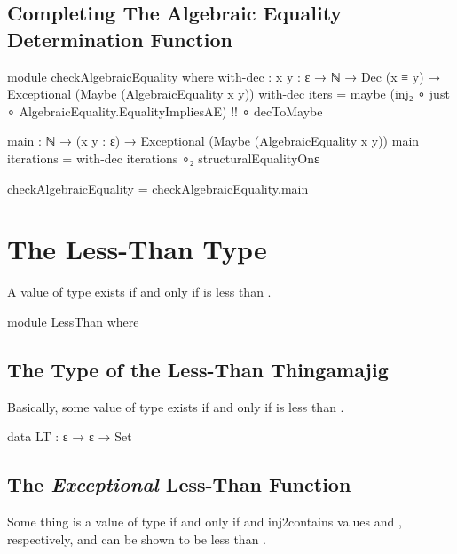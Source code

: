 \documentclass{report}
\begin{document}

\section{Completing The Algebraic Equality Determination Function}

\begin{code}
  module checkAlgebraicEquality where
    with-dec : {x y : ε} →
               ℕ →
               Dec (x ≡ y) →
               Exceptional (Maybe (AlgebraicEquality x y))
    with-dec iters = maybe (inj₂ ∘ just ∘ AlgebraicEquality.EqualityImpliesAE)
                           {!!}
                   ∘ decToMaybe

    main : ℕ → (x y : ε) → Exceptional (Maybe (AlgebraicEquality x y))
    main iterations = with-dec iterations ∘₂ structuralEqualityOnε

  checkAlgebraicEquality = checkAlgebraicEquality.main
\end{code}

\chapter{The Less-Than Type}
A value of type    exists if and only if  is less than .

\begin{code}
  module LessThan where
\end{code}

\section{The Type of the Less-Than Thingamajig}
Basically, some value of type    exists if and only if  is less than .

\begin{code}
    data LT : ε → ε → Set
\end{code}

\section{The \emph{Exceptional} Less-Than Function}
Some thing is a value of type    if and only if  and  \glspl{inj2contain} values  and , respectively, and  can be shown to be less than .
\end{document}
